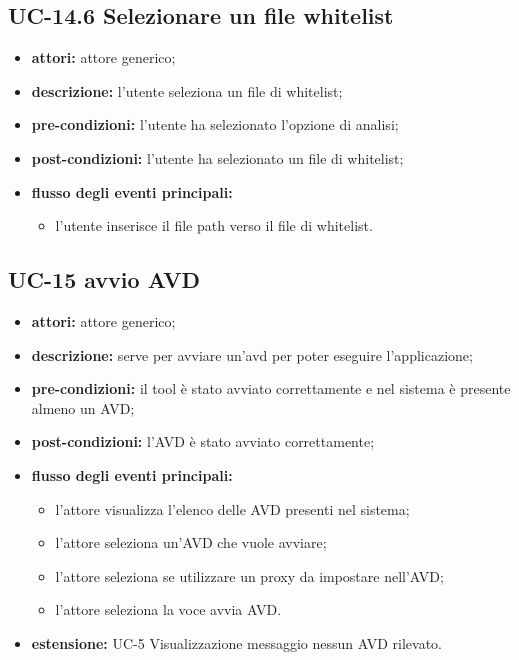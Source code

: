 \subsection*{UC-14.6 Selezionare un file whitelist}
\begin{itemize}
    \item \textbf{attori:} attore generico;
    \item \textbf{descrizione:} l'utente seleziona un file di whitelist;
    \item \textbf{pre-condizioni:} l'utente ha selezionato l'opzione di analisi;
    \item \textbf{post-condizioni:} l'utente ha selezionato un file di whitelist;
    \item \textbf{flusso degli eventi principali:}
    \begin{itemize}
        \item l'utente inserisce il file path verso il file di whitelist.
    \end{itemize}
\end{itemize}


\subsection*{UC-15 avvio AVD}\label{subsec:uc-15-avvio-avd}
\begin{itemize}
    \item \textbf{attori:} attore generico;
    \item \textbf{descrizione:} serve per avviare un'avd per poter eseguire l'applicazione;
    \item \textbf{pre-condizioni:} il tool è stato avviato correttamente e nel sistema è presente almeno un AVD;
    \item \textbf{post-condizioni:} l'AVD è stato avviato correttamente;
    \item \textbf{flusso degli eventi principali:}
    \begin{itemize}
        \item l'attore visualizza l'elenco delle AVD presenti nel sistema;
        \item l'attore seleziona un'AVD che vuole avviare;
        \item l'attore seleziona se utilizzare un proxy da impostare nell'AVD;
        \item l'attore seleziona la voce avvia AVD.
    \end{itemize}
    \item \textbf{estensione:} UC-5 Visualizzazione messaggio nessun AVD rilevato.
\end{itemize}

